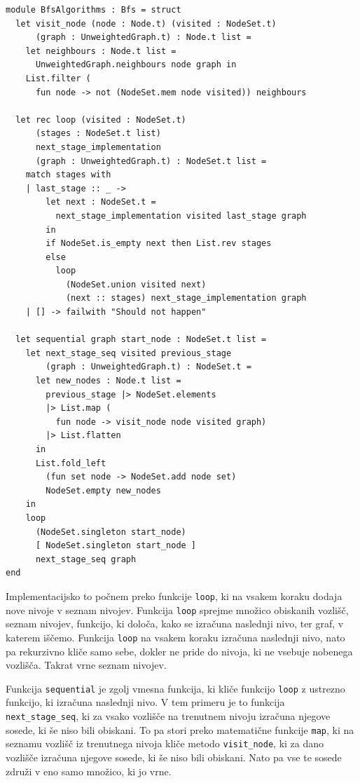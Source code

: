 \documentclass[mat1, tisk]{fmfdelo}
\begin{document}
\begin{lstlisting}[label=lst:bfs_sequential]
module BfsAlgorithms : Bfs = struct
  let visit_node (node : Node.t) (visited : NodeSet.t)
      (graph : UnweightedGraph.t) : Node.t list =
    let neighbours : Node.t list = 
      UnweightedGraph.neighbours node graph in
    List.filter (
      fun node -> not (NodeSet.mem node visited)) neighbours

  let rec loop (visited : NodeSet.t) 
      (stages : NodeSet.t list)
      next_stage_implementation
      (graph : UnweightedGraph.t) : NodeSet.t list =
    match stages with
    | last_stage :: _ ->
        let next : NodeSet.t =
          next_stage_implementation visited last_stage graph
        in
        if NodeSet.is_empty next then List.rev stages
        else
          loop
            (NodeSet.union visited next)
            (next :: stages) next_stage_implementation graph
    | [] -> failwith "Should not happen"

  let sequential graph start_node : NodeSet.t list =
    let next_stage_seq visited previous_stage
        (graph : UnweightedGraph.t) : NodeSet.t =
      let new_nodes : Node.t list =
        previous_stage |> NodeSet.elements
        |> List.map (
          fun node -> visit_node node visited graph)
        |> List.flatten
      in
      List.fold_left
        (fun set node -> NodeSet.add node set)
        NodeSet.empty new_nodes
    in
    loop
      (NodeSet.singleton start_node)
      [ NodeSet.singleton start_node ]
      next_stage_seq graph
end

\end{lstlisting}


Implementacijsko to počnem preko funkcije \texttt{loop}, ki na vsakem koraku dodaja nove nivoje v seznam nivojev.
Funkcija \texttt{loop} sprejme množico obiskanih vozlišč, seznam nivojev, funkcijo, ki določa, kako se izračuna
naslednji nivo, ter graf, v katerem iščemo. Funkcija \texttt{loop} na vsakem koraku izračuna naslednji nivo, nato pa
rekurzivno kliče samo sebe, dokler ne pride do nivoja, ki ne vsebuje nobenega vozlišča. Takrat vrne seznam nivojev.

Funkcija \texttt{sequential} je zgolj vmesna funkcija, ki kliče funkcijo \texttt{loop} z ustrezno funkcijo, ki
izračuna naslednji nivo. V tem primeru je to funkcija \texttt{next\_stage\_seq}, ki za vsako vozlišče na trenutnem
nivoju izračuna njegove sosede, ki še niso bili obiskani. To pa stori preko matematične funkcije \texttt{map}, ki
na seznamu vozlišč iz trenutnega nivoja kliče metodo \texttt{visit\_node}, ki za dano vozlišče izračuna njegove
sosede, ki še niso bili obiskani. Nato pa vse te sosede združi v eno samo množico, ki jo vrne.
\end{document}
